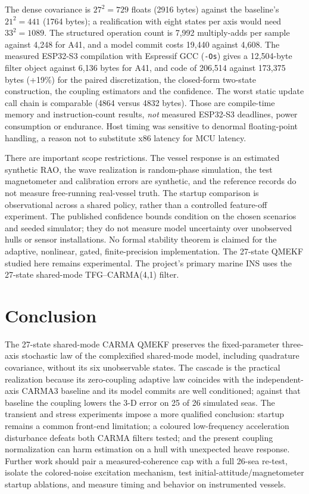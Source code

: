 \documentclass[conference]{IEEEtran}
\begin{document}
The dense covariance is $27^2=729$ floats (2916 bytes) against the
baseline's $21^2=441$ (1764 bytes); a realification with eight states per
axis would need $33^2=1089$. The structured operation count is 7,992
multiply-adds per sample against 4,248 for A41, and a model commit costs
19,440 against 4,608. The measured ESP32-S3 compilation with Espressif GCC
(\texttt{-Os}) gives a 12,504-byte filter object against 6,136 bytes for
A41, and code of 206,514 against 173,375 bytes (+19\%) for the paired
discretization, the closed-form two-state construction, the coupling
estimators and the confidence. The worst static update call chain is
comparable (4864 versus 4832 bytes). Those are compile-time memory
and instruction-count results, \emph{not} measured ESP32-S3 deadlines,
power consumption or endurance. Host timing was sensitive to denormal
floating-point handling, a reason not to substitute x86 latency for MCU
latency.

There are important scope restrictions. The vessel response is an
estimated synthetic RAO, the wave realization is random-phase simulation,
the test magnetometer and calibration errors are synthetic, and the
reference records do not measure free-running real-vessel truth. The
startup comparison is observational across a shared policy, rather than
a controlled feature-off experiment. The published confidence bounds
condition on the chosen scenarios and seeded simulator; they do not
measure model uncertainty over unobserved hulls or sensor installations.
No formal stability theorem is claimed for the adaptive, nonlinear,
gated, finite-precision implementation. The 27-state QMEKF studied here remains experimental.
The project's primary marine INS uses the 27-state shared-mode TFG--CARMA(4,1) filter.

\section{Conclusion}
The 27-state shared-mode CARMA QMEKF preserves the fixed-parameter
three-axis stochastic law of the complexified shared-mode model, including
quadrature covariance, without its six unobservable states. The cascade is
the practical realization because its zero-coupling adaptive law coincides
with the independent-axis CARMA3 baseline and its model commits are well
conditioned; against that baseline the coupling lowers the 3-D error on 25
of 26 simulated seas.
The transient and stress experiments impose a more qualified conclusion:
startup remains a common front-end limitation; a coloured low-frequency
acceleration disturbance defeats both CARMA filters tested; and
the present coupling normalization can harm estimation on a hull with
unexpected heave response. Further work should pair a measured-coherence
cap with a full 26-sea re-test, isolate the colored-noise excitation
mechanism, test initial-attitude/magnetometer startup ablations, and
measure timing and behavior on instrumented vessels.
\end{document}
